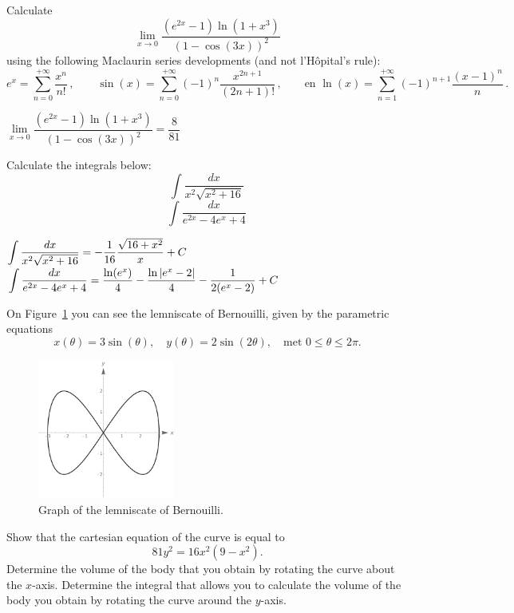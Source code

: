 \begin{Exercise} Calculate
$$
\lim\limits_{x\to0}\dfrac{\left(e^{2x}-1\right)\ln\left(1+x^3\right)}{\left(1-\cos(3x)\right)^2}
$$
using the following Maclaurin series developments (and not l'H\^{o}pital's rule):
$$
e^x=\sum\limits_{n=0}^{+\infty}\dfrac{x^n}{n!}\,,\qquad \sin(x)=\sum\limits_{n=0}^{+\infty}(-1)^n\dfrac{x^{2n+1}}{(2n+1)!}\,,\qquad\text{en }
\ln(x)=\sum\limits_{n=1}^{+\infty}(-1)^{n+1}\dfrac{(x-1)^{n}}{n}\,.$$
\end{Exercise}

\begin{Answer}
$\lim\limits_{x\to0}\dfrac{\left(e^{2x}-1\right)\ln\left(1+x^3\right)}{\left(1-\cos(3x)\right)^2} = \dfrac{8}{81}$    
\end{Answer}


\begin{Exercise} Calculate the integrals below:
\Question $$
\int\dfrac{dx}{x^2\sqrt{x^2+16}}\,
$$
\Question $$
\int\dfrac{dx}{e^{2x}-4e^x+4}\,
$$
\end{Exercise}

\begin{Answer}

\Question $\displaystyle\int\dfrac{dx}{x^2\sqrt{x^2+16}} = -\dfrac{1}{16}\dfrac{\sqrt{16+x^2}}{x} + C$
\Question $\displaystyle\int\dfrac{dx}{e^{2x}-4e^x+4} = \dfrac{\ln(e^x)}{4} - \dfrac{\ln|e^x-2|}{4} - \dfrac{1}{2(e^x-2)} + C$
    
\end{Answer}


\begin{Exercise} On Figure~\ref{Lemniscaat} you can see the lemniscate of Bernouilli, given by the parametric equations
\[ x(\theta) = 3 \sin (\theta), \quad y(\theta) = 2 \sin (2\theta), \quad \text{met } 0 \leq \theta \leq 2\pi. \]

	 \begin{figure}[H]
		\centering
		\centerline{
			\includegraphics[width=0.4\textwidth]{Lemniscaat.pdf}
		}
		\caption{Graph of the lemniscate of Bernouilli.}
		\label{Lemniscaat}
	\end{figure}

\Question Show that the cartesian equation of the curve is equal to
	\[81 y^2 = 16 x^2(9-x^2) . \]
	\Question Determine the volume of the body that you obtain by rotating the curve about the $x$-axis. 
	\Question Determine the integral that allows you to calculate the volume of the body you obtain by rotating the curve around the $y$-axis.


\end{Exercise}

